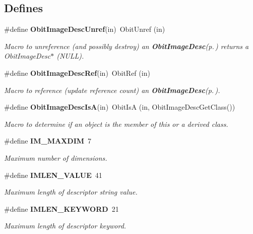 \subsection*{Defines}
\begin{CompactItemize}
\item 
\#define {\bf Obit\-Image\-Desc\-Unref}(in)\ Obit\-Unref (in)
\begin{CompactList}\small\item\em Macro to unreference (and possibly destroy) an {\bf Obit\-Image\-Desc}{\rm (p.\,\pageref{structObitImageDesc})} returns a Obit\-Image\-Desc$\ast$ (NULL). \item\end{CompactList}\item 
\#define {\bf Obit\-Image\-Desc\-Ref}(in)\ Obit\-Ref (in)
\begin{CompactList}\small\item\em Macro to reference (update reference count) an {\bf Obit\-Image\-Desc}{\rm (p.\,\pageref{structObitImageDesc})}. \item\end{CompactList}\item 
\#define {\bf Obit\-Image\-Desc\-Is\-A}(in)\ Obit\-Is\-A (in, Obit\-Image\-Desc\-Get\-Class())
\begin{CompactList}\small\item\em Macro to determine if an object is the member of this or a derived class. \item\end{CompactList}\item 
\#define {\bf IM\_\-MAXDIM}\ 7
\begin{CompactList}\small\item\em Maximum number of dimensions. \item\end{CompactList}\item 
\#define {\bf IMLEN\_\-VALUE}\ 41
\begin{CompactList}\small\item\em Maximum length of descriptor string value. \item\end{CompactList}\item 
\#define {\bf IMLEN\_\-KEYWORD}\ 21
\begin{CompactList}\small\item\em Maximum length of descriptor keyword. \item\end{CompactList}\end{CompactItemize}
